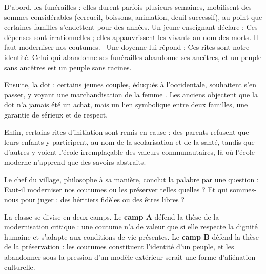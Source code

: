 \documentclass[11pt]{article}
\newcommand{\cle}[1]{{\popxbold\color{popdark}#1}}
\newcounter{popsec}
\newcounter{popsub}
\newcommand{\courssub}[1]{%
  \stepcounter{popsub}%
  \par\vspace{9pt}\noindent{\popxbold\fontsize{11.5}{13}\selectfont\color{popink}{\color{poporange}\thepopsec.\thepopsub}\hspace{6pt}#1}\par\nopagebreak\vspace{4pt}
}
\begin{document}
D'abord, les \cle{funérailles} : elles durent parfois plusieurs semaines, mobilisent des sommes considérables (cercueil, boissons, animation, deuil successif), au point que certaines familles s'endettent pour des années. Un jeune enseignant déclare : \guillemotleft Ces dépenses sont irrationnelles ; elles appauvrissent les vivants au nom des morts. Il faut moderniser nos coutumes. \guillemotright\ Une doyenne lui répond : \guillemotleft Ces rites sont notre identité. Celui qui abandonne ses funérailles abandonne ses ancêtres, et un peuple sans ancêtres est un peuple sans racines. \guillemotright

Ensuite, la \cle{dot} : certains jeunes couples, éduqués à l'occidentale, souhaitent s'en passer, y voyant une \guillemotleft marchandisation de la femme \guillemotright. Les anciens objectent que la dot n'a jamais été un achat, mais un lien symbolique entre deux familles, une garantie de sérieux et de respect.

Enfin, certains \cle{rites d'initiation} sont remis en cause : des parents refusent que leurs enfants y participent, au nom de la scolarisation et de la santé, tandis que d'autres y voient l'école irremplaçable des valeurs communautaires, là où l'école moderne n'apprend que des savoirs abstraits.

Le chef du village, philosophe à sa manière, conclut la palabre par une question : \guillemotleft Faut-il moderniser nos coutumes ou les préserver telles quelles ? Et qui sommes-nous pour juger : des héritiers fidèles ou des êtres libres ? \guillemotright

La classe se divise en deux camps. Le \textbf{camp A} défend la thèse de la modernisation critique : une coutume n'a de valeur que si elle respecte la dignité humaine et s'adapte aux conditions de vie présentes. Le \textbf{camp B} défend la thèse de la préservation : les coutumes constituent l'identité d'un peuple, et les abandonner sous la pression d'un modèle extérieur serait une forme d'aliénation culturelle.

\courssub{Consignes}
\end{document}
